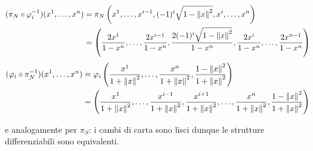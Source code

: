 {\begin{align}
	\begin{split}
		(\pi_{N} \circ \varphi_{i}^{-1})(x^{1},\dots,x^{n}) &= \pi_{N} \left( x^{1}, \dots, x^{i-1}, (-1)^{i} \sqrt{1 - \norm{x}^{2}}, x^{i}, \dots, x^{n} \right) \\
		&= \left( \dfrac{2 x^{1}}{1-x^{n}}, \dots, \dfrac{2 x^{i-1}}{1-x^{n}}, \dfrac{2 (-1)^{i} \sqrt{1 - \norm{x}^{2}}}{1-x^{n}}, \dfrac{2 x^{i}}{1-x^{n}}, \dots, \dfrac{2 x^{n-1}}{1-x^{n}} \right)
	\end{split}
\end{align}
%
\begin{align}
	\begin{split}
		(\varphi_{i} \circ \pi_{N}^{-1})(x^{1},\dots,x^{n}) &= \varphi_{i} \left( \dfrac{x^{1}}{1 + \norm{x}^{2}}, \dots, \dfrac{x^{n}}{1 + \norm{x}^{2}}, \dfrac{1 - \norm{x}^{2}}{1 + \norm{x}^{2}} \right) \\
		&= \left( \dfrac{x^{1}}{1 + \norm{x}^{2}}, \dots, \dfrac{x^{i-1}}{1 + \norm{x}^{2}}, \dfrac{x^{i+1}}{1 + \norm{x}^{2}}, \dots, \dfrac{x^{n}}{1 + \norm{x}^{2}}, \dfrac{1 - \norm{x}^{2}}{1 + \norm{x}^{2}} \right)
	\end{split}
\end{align}

e analogamente per $ \pi_{S} $: i cambi di carta sono lisci dunque le strutture differenziabili sono equivalenti.
}



